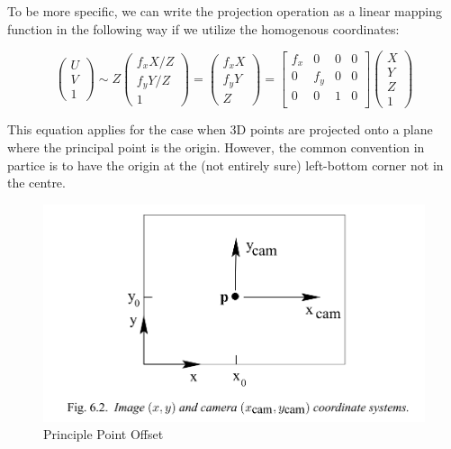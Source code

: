 \documentclass[a4paper]{report}
\numberwithin{figure}{section}
\begin{document}
To be more specific,
we can write the projection operation as a linear mapping function 
in the following way if we utilize the homogenous coordinates:

\begin{equation}
  \begin{pmatrix}
    U\\
    V\\
    1
  \end{pmatrix}
  \sim
  Z
  \begin{pmatrix}
    f_xX/Z\\
    f_yY/Z\\
    1
  \end{pmatrix}
  =
  \begin{pmatrix}
    f_xX\\
    f_yY\\
    Z
  \end{pmatrix}
  =
  \begin{bmatrix}
    f_x & 0 & 0 & 0\\
    0 & f_y & 0 & 0\\
    0 & 0 & 1 & 0\\
  \end{bmatrix}
  \begin{pmatrix}
    X\\
    Y\\
    Z\\
    1
  \end{pmatrix}
\end{equation} \label{eq:proj_func_w_f}

This equation applies for the case when 3D points are 
projected onto a plane where the principal point is the origin. 
However, the common convention in partice 
is to have the origin at the (not entirely sure) left-bottom corner not in the centre.

\begin{figure}[H]
	\centering
	\includegraphics[width=\linewidth,natwidth=640,natheight=640]
  {fig/ref_imgs/pinhole_offset.png}
	\caption{Principle Point Offset}
	\label{fig:pinhole_offset}
\end{figure}
\end{document}
